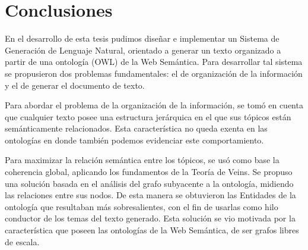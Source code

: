 \chapter{Conclusiones}
En el desarrollo de esta tesis pudimos diseñar e implementar un Sistema de Generación de Lenguaje Natural, orientado a generar un texto organizado a partir de una ontología (OWL) de la Web Semántica. Para desarrollar tal sistema se propusieron dos problemas fundamentales: el de organización de la información y el de generar el documento de texto. 

Para abordar el problema de la organización de la información, se tomó en cuenta que cualquier texto  posee una estructura jerárquica en el que sus tópicos  están semánticamente relacionados. Esta característica no queda exenta en las ontologías en donde también podemos evidenciar este comportamiento. 

Para maximizar la relación semántica entre los tópicos, se usó como base la coherencia global, aplicando los fundamentos de la Teoría de Veins. Se propuso una solución basada en el análisis del grafo subyacente a la ontología, midiendo las relaciones entre sus nodos. De esta manera se obtuvieron las Entidades de la ontología que resultaban más sobresalientes, con el fin de usarlas como hilo conductor de los temas del texto generado.
Esta solución se vio motivada por la característica que poseen las ontologías de la Web Semántica, de ser grafos libres de escala. 


